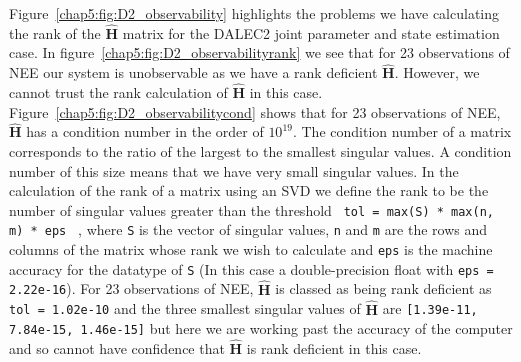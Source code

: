 Figure~\ref{chap5:fig:D2_observability} highlights the problems we have calculating the rank of the $\hat{\textbf{H}}$ matrix for the DALEC2 joint parameter and state estimation case. In figure~\ref{chap5:fig:D2_observabilityrank} we see that for 23 observations of NEE our system is unobservable as we have a rank deficient $\hat{\textbf{H}}$. However, we cannot trust the rank calculation of $\hat{\textbf{H}}$ in this case. Figure~\ref{chap5:fig:D2_observabilitycond} shows that for 23 observations of NEE, $\hat{\textbf{H}}$ has a condition number in the order of $10^{19}$. The condition number of a matrix corresponds to the ratio of the largest to the smallest singular values. A condition number of this size means that we have very small singular values. In the calculation of the rank of a matrix using an SVD we define the rank to be the number of singular values greater than the threshold \texttt{ tol = max(S) * max(n, m) * eps } \citep{press2007numerical}, where \texttt{S} is the vector of singular values, \texttt{n} and \texttt{m} are the rows and columns of the matrix whose rank we wish to calculate and \texttt{eps} is the machine accuracy for the datatype of \texttt{S} (In this case a double-precision float with \texttt{eps = 2.22e-16}). For 23 observations of NEE, $\hat{\textbf{H}}$ is classed as being rank deficient as \texttt{tol = 1.02e-10} and the three smallest singular values of $\hat{\textbf{H}}$ are \texttt{[1.39e-11, 7.84e-15, 1.46e-15]} but here we are working past the accuracy of the computer and so cannot have confidence that $\hat{\textbf{H}}$ is rank deficient in this case.

